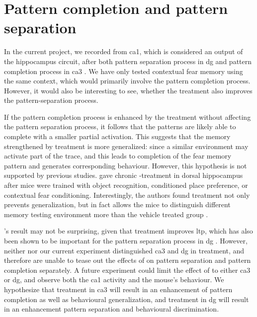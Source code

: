 \section{Pattern completion and pattern separation}

In the current project, we recorded from \gls{ca1}, which is considered an output of the hippocampus circuit, after both pattern separation process in \gls{dg} and pattern completion process in \gls{ca3} \citep{rolls13}. We have only tested contextual fear memory using the same context, which would primarily involve the pattern completion process. However, it would also be interesting to see, whether the \tglu{} treatment also improves the pattern-separation process. 

If the pattern completion process is enhanced by the \tglu{} treatment without affecting the pattern separation process, it follows that the patterns are likely able to complete with a smaller partial activation. This suggests that the memory strengthened by \tglu{} treatment is more generalized: since a similar environment may activate part of the trace, and this leads to completion of the fear memory pattern and generates corresponding behaviour. However, this hypothesis is not supported by previous studies. \citet{migues16} gave chronic \tglu{}-treatment in dorsal hippocampus after mice were trained with object recognition, conditioned place preference, or contextual fear conditioning. Interestingly, the authors found \tglu{} treatment not only prevents generalization, but in fact allows the mice to distinguish different memory testing environment more than the vehicle treated group \citep{migues16}. 

\citet{migues16}'s result may not be surprising, given that \tglu{} treatment improves \gls{ltp}, which has also been shown to be important for the pattern separation process in \gls{dg} \citep{rolls13}. However, neither \citet{migues16} nor our current experiment distinguished \gls{ca3} and \gls{dg} in \tglu{} treatment, and therefore are unable to tease out the effects of \tglu{} on pattern separation and pattern completion separately. A future experiment could limit the effect of \tglu{} to either \gls{ca3} or \gls{dg}, and observe both the \gls{ca1} activity and the mouse's behaviour. We hypothesize that \tglu{} treatment in \gls{ca3} will result in an enhancement of pattern completion as well as behavioural generalization, and treatment in \gls{dg} will result in an enhancement pattern separation and behavioural discrimination. 

